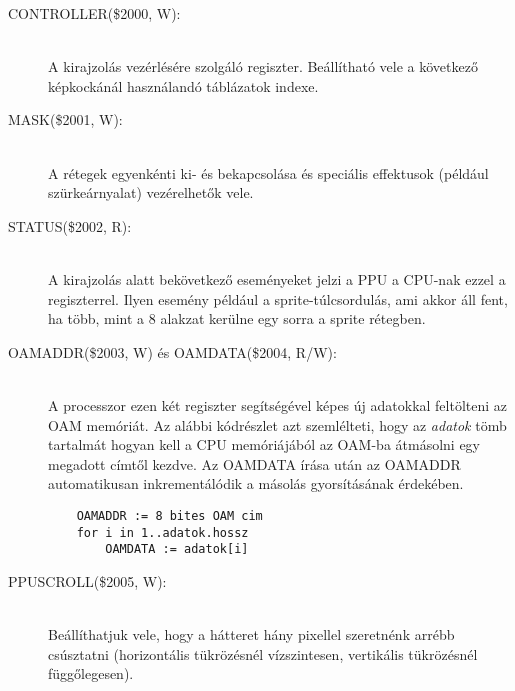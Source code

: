 \begin{description}
	\item[CONTROLLER(\$2000, W):] \hfill \\
	A kirajzolás vezérlésére szolgáló regiszter.
	Beállítható vele a következő képkockánál használandó táblázatok indexe.
	\item[MASK(\$2001, W):] \hfill \\
	A rétegek egyenkénti ki- és bekapcsolása és speciális effektusok 
	(például szürkeárnyalat) vezérelhetők vele.
	\item[STATUS(\$2002, R):] \hfill \\
	A kirajzolás alatt bekövetkező eseményeket jelzi a PPU a CPU-nak ezzel a regiszterrel.
	Ilyen esemény például a sprite-túlcsordulás, ami akkor áll fent, ha több, mint a 8 alakzat kerülne egy sorra a sprite rétegben. 
	\item[OAMADDR(\$2003, W) és OAMDATA(\$2004, R/W):] \hfill \\
	A processzor ezen két regiszter segítségével képes új adatokkal feltölteni az OAM memóriát.
	Az alábbi kódrészlet azt szemlélteti, hogy az \emph{adatok} tömb tartalmát hogyan kell a CPU memóriájából
	az OAM-ba átmásolni egy megadott címtől kezdve. Az OAMDATA írása után az OAMADDR automatikusan inkrementálódik a másolás gyorsításának érdekében.
	\begin{lstlisting}
	OAMADDR := 8 bites OAM cim
	for i in 1..adatok.hossz
		OAMDATA := adatok[i]
	\end{lstlisting}
	\item[PPUSCROLL(\$2005, W):] \hfill \\
	Beállíthatjuk vele, hogy a hátteret hány pixellel szeretnénk arrébb csúsztatni (horizontális tükrözésnél vízszintesen, vertikális tükrözésnél függőlegesen).

\end{description}
